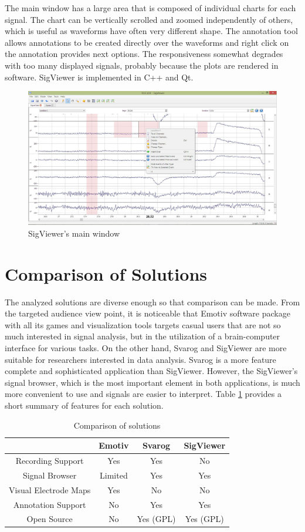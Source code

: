The main window has a large area that is composed of individual charts for each signal. The chart can be vertically scrolled and zoomed independently of others, which is useful as waveforms have often very different shape. The annotation tool allows annotations to be created directly over the waveforms and right click on the annotation provides next options. The responsiveness somewhat degrades with too many displayed signals, probably because the plots are rendered in software. SigViewer is implemented in C++ and Qt.

\begin{figure}[htb]
	\centering
	\includegraphics[width=0.8\linewidth]{fig/sigviewer.jpg}
	\caption{SigViewer's main window}
	\label{fig:sigviewer}
\end{figure}

\section{Comparison of Solutions}
The analyzed solutions are diverse enough so that comparison can be made. From the targeted audience view point, it is noticeable that Emotiv software package with all its games and visualization tools targets casual users that are not so much interested in signal analysis, but in the utilization of a brain-computer interface for various tasks. On the other hand, Svarog and SigViewer are more suitable for researchers interested in data analysis. Svarog is a more feature complete and sophisticated application than SigViewer. However, the SigViewer's signal browser, which is the most important element in both applications, is much more convenient to use and signals are easier to interpret. Table \ref{t:comparison} provides a short summary of features for each solution. 

\begin{table}[htbp]
	\centering
	\begin{tabular}{|c|c|c|c|}
		\hline  & Emotiv & Svarog & SigViewer \\ 
		\hline Recording Support & Yes & Yes & No \\ 
		\hline Signal Browser & Limited & Yes & Yes \\ 
		\hline Visual Electrode Maps & Yes & No & No \\ 
		\hline Annotation Support & No & Yes & Yes \\ 
		\hline Open Source & No & Yes (GPL) & Yes (GPL) \\ 
		\hline 
	\end{tabular} 
	\caption{Comparison of solutions}
	\label{t:comparison}
\end{table}

